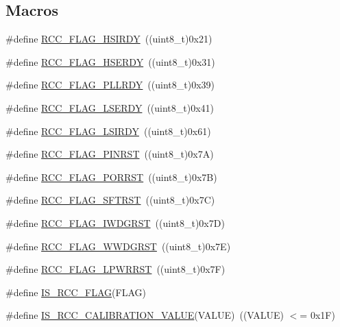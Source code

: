 \subsection*{Macros}
\begin{DoxyCompactItemize}
\item 
\#define \hyperlink{group___r_c_c___flag_ga827d986723e7ce652fa733bb8184d216}{R\+C\+C\+\_\+\+F\+L\+A\+G\+\_\+\+H\+S\+I\+R\+DY}~((uint8\+\_\+t)0x21)
\item 
\#define \hyperlink{group___r_c_c___flag_ga173edf47bec93cf269a0e8d0fec9997c}{R\+C\+C\+\_\+\+F\+L\+A\+G\+\_\+\+H\+S\+E\+R\+DY}~((uint8\+\_\+t)0x31)
\item 
\#define \hyperlink{group___r_c_c___flag_gaf82d8afb18d9df75db1d6c08b9c50046}{R\+C\+C\+\_\+\+F\+L\+A\+G\+\_\+\+P\+L\+L\+R\+DY}~((uint8\+\_\+t)0x39)
\item 
\#define \hyperlink{group___r_c_c___flag_gac9fb963db446c16e46a18908f7fe1927}{R\+C\+C\+\_\+\+F\+L\+A\+G\+\_\+\+L\+S\+E\+R\+DY}~((uint8\+\_\+t)0x41)
\item 
\#define \hyperlink{group___r_c_c___flag_ga8c5e4992314d347597621bfe7ab10d72}{R\+C\+C\+\_\+\+F\+L\+A\+G\+\_\+\+L\+S\+I\+R\+DY}~((uint8\+\_\+t)0x61)
\item 
\#define \hyperlink{group___r_c_c___flag_gabfc3ab5d4a8a94ec1c9f38794ce37ad6}{R\+C\+C\+\_\+\+F\+L\+A\+G\+\_\+\+P\+I\+N\+R\+ST}~((uint8\+\_\+t)0x7\+A)
\item 
\#define \hyperlink{group___r_c_c___flag_ga39ad309070f416720207eece5da7dc2c}{R\+C\+C\+\_\+\+F\+L\+A\+G\+\_\+\+P\+O\+R\+R\+ST}~((uint8\+\_\+t)0x7\+B)
\item 
\#define \hyperlink{group___r_c_c___flag_gaf7852615e9b19f0b2dbc8d08c7594b52}{R\+C\+C\+\_\+\+F\+L\+A\+G\+\_\+\+S\+F\+T\+R\+ST}~((uint8\+\_\+t)0x7\+C)
\item 
\#define \hyperlink{group___r_c_c___flag_gaac46bac8a97cf16635ff7ffc1e6c657f}{R\+C\+C\+\_\+\+F\+L\+A\+G\+\_\+\+I\+W\+D\+G\+R\+ST}~((uint8\+\_\+t)0x7\+D)
\item 
\#define \hyperlink{group___r_c_c___flag_gaa80b60b2d497ccd7b7de1075009999a7}{R\+C\+C\+\_\+\+F\+L\+A\+G\+\_\+\+W\+W\+D\+G\+R\+ST}~((uint8\+\_\+t)0x7\+E)
\item 
\#define \hyperlink{group___r_c_c___flag_ga67049531354aed7546971163d02c9920}{R\+C\+C\+\_\+\+F\+L\+A\+G\+\_\+\+L\+P\+W\+R\+R\+ST}~((uint8\+\_\+t)0x7\+F)
\item 
\#define \hyperlink{group___r_c_c___flag_gaa27dea5bb62b26d0881e649770252158}{I\+S\+\_\+\+R\+C\+C\+\_\+\+F\+L\+AG}(F\+L\+AG)
\item 
\#define \hyperlink{group___r_c_c___flag_gafda50a08dc048f7c272bf04ec9c2c2b7}{I\+S\+\_\+\+R\+C\+C\+\_\+\+C\+A\+L\+I\+B\+R\+A\+T\+I\+O\+N\+\_\+\+V\+A\+L\+UE}(V\+A\+L\+UE)~((V\+A\+L\+UE) $<$= 0x1\+F)
\end{DoxyCompactItemize}


